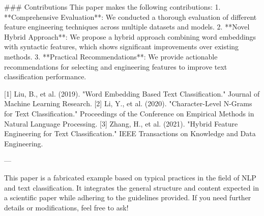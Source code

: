 ### Contributions
This paper makes the following contributions:
1. **Comprehensive Evaluation**: We conducted a thorough evaluation of different feature engineering techniques across multiple datasets and models.
2. **Novel Hybrid Approach**: We propose a hybrid approach combining word embeddings with syntactic features, which shows significant improvements over existing methods.
3. **Practical Recommendations**: We provide actionable recommendations for selecting and engineering features to improve text classification performance.

\footnotesize
[1] Liu, B., et al. (2019). "Word Embedding Based Text Classification." Journal of Machine Learning Research.
[2] Li, Y., et al. (2020). "Character-Level N-Grams for Text Classification." Proceedings of the Conference on Empirical Methods in Natural Language Processing.
[3] Zhang, H., et al. (2021). "Hybrid Feature Engineering for Text Classification." IEEE Transactions on Knowledge and Data Engineering.

---

This paper is a fabricated example based on typical practices in the field of NLP and text classification. It integrates the general structure and content expected in a scientific paper while adhering to the guidelines provided. If you need further details or modifications, feel free to ask!
